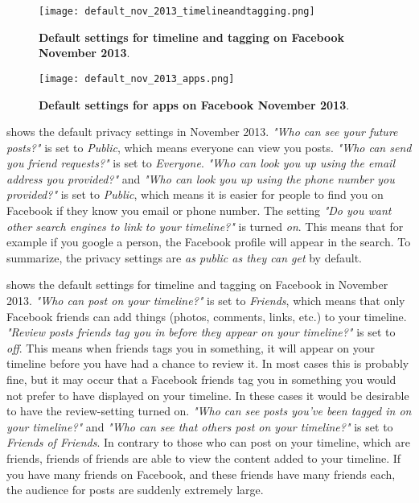 \begin{figure}[h!]
\centering
\texttt{[image: default\_nov\_2013\_timelineandtagging.png]}
\caption[Default settings for timeline and tagging on Facebook November 2013]{\textbf{Default settings for timeline and tagging on Facebook November 2013}.} 
\label{fig:timelineandtagging2013}
\end{figure}

\begin{figure}[h!]
\centering
\texttt{[image: default\_nov\_2013\_apps.png]}
\caption[Default settings for apps on Facebook November 2013]{\textbf{Default  settings for apps on Facebook November 2013}.} 
\label{fig:apps2013}
\end{figure}

 shows the default privacy settings in November 2013.  \textit{"Who can see your future posts?"} is set to \textit{Public}, which means everyone can view you posts. \textit{"Who can send you friend requests?"} is set to \textit{Everyone}. \textit{"Who can look you up using the email address you provided?"} and \textit{"Who can look you up using the phone number you provided?"} is set to \textit{Public}, which means it is easier for people to find you on Facebook if they know you email or phone number. The setting \textit{"Do you want other search engines to link to your timeline?"} is turned \textit{on}. This means that for example if you google a person, the Facebook profile will appear in the search. To summarize, the privacy settings are \textit{as public as they can get} by default. 

 shows the default settings for timeline and tagging on Facebook in November 2013. \textit{"Who can post on your timeline?"} is set to \textit{Friends}, which means that only Facebook friends can add things (photos, comments, links, etc.) to your timeline. \textit{"Review posts friends tag you in before they appear on your timeline?" }is set to\textit{ off}. This means when friends tags you in something, it will appear on your timeline before you have had a chance to review it. In most cases this is probably fine, but it may occur that a Facebook friends tag you in something you would not prefer to have displayed on your timeline. In these cases it would be desirable to have the review-setting turned on. \textit{"Who can see posts you've been tagged in on your timeline?"} and \textit{"Who can see that others post on your timeline?"} is set to \textit{Friends of Friends}. In contrary to those who can post on your timeline, which are friends, friends of friends are able to view the content added to your timeline. If you have many friends on Facebook, and these friends have many friends each, the audience for posts are suddenly extremely large. 

